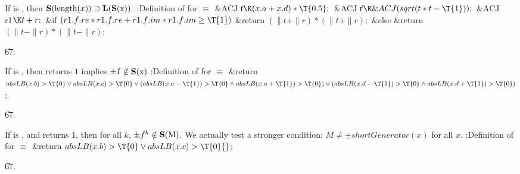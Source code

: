 If  is , then
$\reps{\PB{\\{length}(\|x)}} \supset \tlength{\reps{x}}$.
\endproposition
\Y\B\4:Definition of  for \X${}\equiv{}$%
\6
\&{ACJ} \|t${}\K(\|x.\|a+\|x.\|d)*\T{0.5};{}$\6
\&{ACJ} \|r${}\K\&{ACJ}(\\{sqrt}(\|t*\|t-\T{1}));{}$\6
\&{ACJ} \\{r1}${}\K\|t+\|r;{}$\7
\&{if} ${}(\\{r1}.\|f.\\{re}*\\{r1}.\|f.\\{re}+\\{r1}.\|f.\\{im}*\\{r1}.\|f.%
\\{im}\G\T{1}){}$\1\5
\&{return} ${}(\|t+\|r)*(\|t+\|r);{}$\2\6
\&{else}\1\5
\&{return} ${}(\|t-\|r)*(\|t-\|r){}$;\2\par
\U67.\fi

If  is , then
 returns $1$ implies $\pm I \notin \bf S(\hbox{x})$
\endproposition
\Y\B\4:Definition of  for \X${}%
\E{}$\6
\&{return} ${}\\{absLB}(\|x.\|b)>\T{0}\V\\{absLB}(\|x.\|c)>\T{0}\V(\\{absLB}(%
\|x.\|a-\T{1})>\T{0}\W\\{absLB}(\|x.\|a+\T{1})>\T{0})\V(\\{absLB}(\|x.\|d-%
\T{1})>\T{0}\W\\{absLB}(\|x.\|d+\T{1})>\T{0}){}$;\par
\U67.\fi

If  is , and  returns 1,
then for all $k$, $\pm f^k \notin \bf S(\hbox{M})$.
\endproposition
We actually test a stronger condition:
$M \neq \pm shortGenerator(x)$ for all $x$.
\Y\B\4:Definition of  for \X${}%
\E{}$\6
\&{return} ${}\\{absLB}(\|x.\|b)>\T{0}\V\\{absLB}(\|x.\|c)>\T{0}{}$;\par
\U67.\fi

